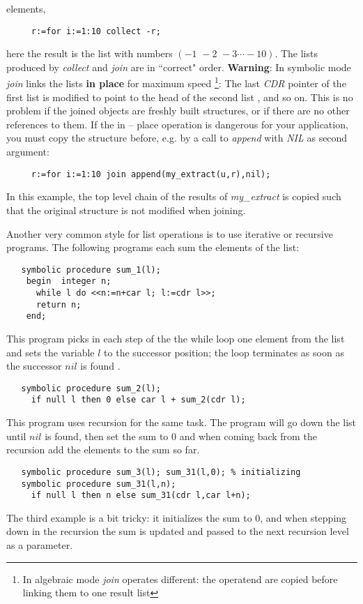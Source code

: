 \documentclass[11pt]{article}
\begin{document}
elements,
\begin{verbatim}
     r:=for i:=1:10 collect -r;
\end{verbatim}
here the result is the list with numbers $(-1\,\, -2\,\, -3 \cdots -10)$.
The lists produced by {\em collect} and {\em join} are in ``correct" 
order.
{\bf Warning}: In symbolic mode  {\em join} links the lists 
{\bf in place} for maximum speed
\footnote{In algebraic mode {\em join} operates different: the operatend
are copied before linking them to one result list}:
The last {\em CDR} pointer  of the first list is modified to 
point to the head of the second list , and so on.
This is no problem if the joined objects are freshly built
structures, or if there are no other references to them.
If the in -- place operation is dangerous for your application,
you must copy the structure before, e.g. by a call to {\em append}
with {\em NIL} as second argument:
\begin{verbatim}
     r:=for i:=1:10 join append(my_extract(u,r),nil);
\end{verbatim}
In this example, the top level chain of the results of {\em my\_extract}
is copied such that the original structure is not modified when
joining.


Another very common style for list operations is to use 
iterative or recursive programs. The following programs each
sum the elements of the list:
\begin{verbatim}
   symbolic procedure sum_1(l);
    begin  integer n;
      while l do <<n:=n+car l; l:=cdr l>>;
      return n;
    end;
\end{verbatim}
This program picks in each step of the the while loop one
element from the list and sets the variable $l$ to
the successor position; the loop terminates as soon as the 
successor $nil$ is found .
\begin{verbatim}
   symbolic procedure sum_2(l);
     if null l then 0 else car l + sum_2(cdr l);
\end{verbatim}
This program uses recursion for the same task.
The program will go down the list until $nil$ is found,
then set the sum to $0$ and when coming back from the
recursion add the elements to the sum so far.
\begin{verbatim}
   symbolic procedure sum_3(l); sum_31(l,0); % initializing
   symbolic procedure sum_31(l,n);
     if null l then n else sum_31(cdr l,car l+n);
\end{verbatim}
The third example is a bit tricky: it initializes
the sum to 0, and when stepping down in the
recursion the sum is updated and passed to the next
recursion level as a parameter.
\end{document}
